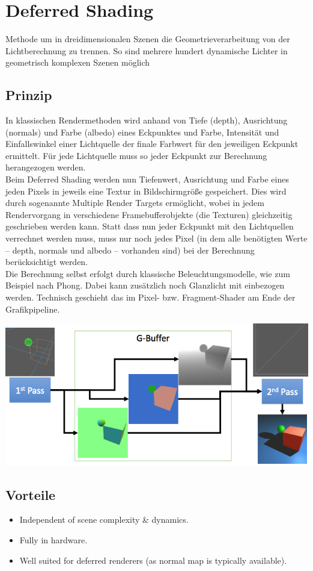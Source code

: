 \documentclass[10pt]{article}
\begin{document}
\newpage
\section{Deferred Shading}
Methode um in dreidimensionalen Szenen die Geometrieverarbeitung von der Lichtberechnung zu trennen. So sind mehrere hundert dynamische Lichter in geometrisch komplexen Szenen möglich
\subsection{Prinzip}
In klassischen Rendermethoden wird anhand von Tiefe (depth), Ausrichtung (normals) und Farbe (albedo) eines Eckpunktes und Farbe, Intensität und Einfallswinkel einer Lichtquelle der finale Farbwert für den jeweiligen Eckpunkt ermittelt. Für jede Lichtquelle muss so jeder Eckpunkt zur Berechnung herangezogen werden. \\
Beim Deferred Shading werden nun Tiefenwert, Ausrichtung und Farbe eines jeden Pixels in jeweils eine Textur in Bildschirmgröße gespeichert. Dies wird durch sogenannte Multiple Render Targets ermöglicht, wobei in jedem Rendervorgang in verschiedene Framebufferobjekte (die Texturen) gleichzeitig geschrieben werden kann. Statt dass nun jeder Eckpunkt mit den Lichtquellen verrechnet werden muss, muss nur noch jedes Pixel (in dem alle benötigten Werte – depth, normals und albedo – vorhanden sind) bei der Berechnung berücksichtigt werden. \\
Die Berechnung selbst erfolgt durch klassische Beleuchtungsmodelle, wie zum Beispiel nach Phong. Dabei kann zusätzlich noch Glanzlicht mit einbezogen werden. Technisch geschieht das im Pixel- bzw. Fragment-Shader am Ende der Grafikpipeline.
\begin{center}
	\includegraphics[scale=0.4]{deferred-rendering.png}
\end{center}

\subsection{Vorteile}
\begin{itemize}
	\item Independent of scene complexity \& dynamics.
	\item Fully in hardware.
	\item Well suited for deferred renderers (as normal map is typically available).
\end{itemize}
\end{document}
